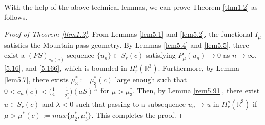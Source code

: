 \documentclass[11pt]{article}
\numberwithin{equation}{section}
\begin{document}
With the help of the above technical lemmas, we can prove Theorem \ref{thm1.2} 
as follows.
\begin{proof}[Proof of Theorem \ref{thm1.2}]
From Lemmas \ref{lem5.1} and \ref{lem5.2}, the functional $I_\mu$ satisfies 
the Mountain pass geometry. By Lemmas \ref{lem5.4} and \ref{lem5.5}, there exist 
a $(PS)_{c_\mu(c)}$-sequence $\{u_n\}\subset S_{r}(c)$ satisfying  
$P_\mu(u_n)\to 0$ as $n\to \infty$, \eqref{5.16}, and \eqref{5.166}, 
which is bounded in $H^s_r(\mathbb{R}^3)$. 
Furthermore, by Lemma \ref{lem5.7}, there exists $\mu^*_3:=\mu^*_3(c)$ large enough 
such that $0<c_\mu(c)<\Big(\frac{1}{4}-\frac{1}{2^*_s}\Big)(aS)^{\frac{3}{2s}}$ 
for $\mu>\mu^*_3$. Then, by Lemma \ref{rem5.91}, there exist 
$u\in S_r(c)$ and $\lambda<0$ such that passing to a subsequence $u_n\to u$ in 
$H^s_r(\mathbb{R}^3)$ if   $\mu>\mu^*(c):=max\{\mu^*_2, \mu^*_3\}$. 
This completes the proof.
\end{proof}
\end{document}
